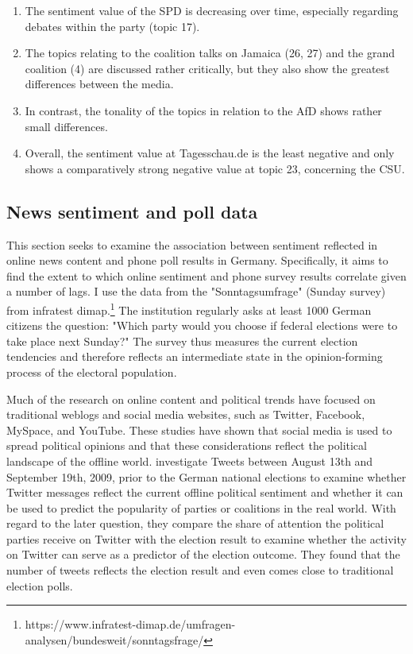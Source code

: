 \documentclass[12pt,a4paper,notitlepage]{article}
\begin{document}
\begin{enumerate}
	\item The sentiment value of the SPD is decreasing over time, especially regarding debates within the party (topic 17). 
	\item The topics relating to the coalition talks on Jamaica (26, 27) and the grand coalition (4) are discussed rather critically, but they also show the greatest differences between the media. 
	\item In contrast, the tonality of the topics in relation to the AfD shows rather small differences. 
	\item Overall, the sentiment value at Tagesschau.de is the least negative and only shows a comparatively strong negative value at topic 23, concerning the CSU.
\end{enumerate} 

\subsection{News sentiment and poll data}\label{ch_correlation}

This section seeks to examine the association between sentiment reflected in online news content and phone poll results in Germany. Specifically, it aims to find the extent to which online sentiment and phone survey results correlate given a number of lags. I use the data from the "Sonntagsumfrage" (Sunday survey) from infratest dimap.\footnote{https://www.infratest-dimap.de/umfragen-analysen/bundesweit/sonntagsfrage/} The institution regularly asks at least 1000 German citizens the question: "Which party would you choose if federal elections were to take place next Sunday?" The survey thus measures the current election tendencies and therefore reflects an intermediate state in the opinion-forming process of the electoral population.

Much of the research on online content and political trends have focused on traditional weblogs and social media websites, such as Twitter, Facebook, MySpace, and YouTube. These studies have shown that social media is used to spread political opinions and that these considerations reflect the political landscape of the offline world. \citet{tumasjan_predicting_2010} investigate Tweets between August 13th and September 19th, 2009, prior to the German national elections to examine whether Twitter messages reflect the current offline political sentiment and whether it can be used to predict the popularity of parties or coalitions in the real world. With regard to the later question, they compare the share of attention the political parties receive on Twitter with the election result to examine whether the activity on Twitter can serve as a predictor of the election outcome. They found that the number of tweets reflects the election result and even comes close to traditional election polls.
\end{document}
